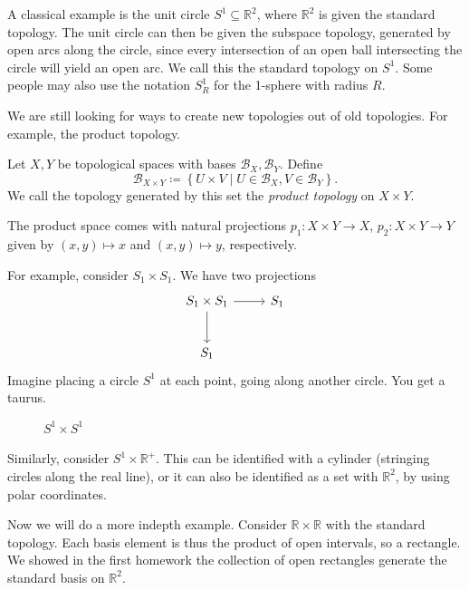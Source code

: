 A classical example is the unit circle $S^1\subseteq \mathbb{R} ^2$, where $\mathbb{R} ^2$ is given the standard topology. The unit circle can then be given the subspace topology, generated by open arcs along the circle, since every intersection of an open ball intersecting the circle will yield an open arc. We call this the standard topology on $S^1$. Some people may also use the notation $S_R^1$ for the 1-sphere with radius $R$.

We are still looking for ways to create new topologies out of old topologies. For example, the product topology.
\begin{definition}\label{dfn:2.8}
	Let $X,Y$ be topological spaces with bases $\mathcal{B}_X,\mathcal{B}_Y$. Define
	\[
		\mathcal{B}_{X\times Y} \coloneqq \left\{ U\times V\mid U\in \mathcal{B}_X, V\in \mathcal{B}_Y \right\} 
	.\]
	We call the topology generated by this set the \emph{product topology} on $X\times Y$.
\end{definition}
The product space comes with natural projections $p_1 : X\times Y \to X$, $p_2 : X\times Y \to Y$ given by $(x,y)\mapsto x$ and $(x,y)\mapsto y$, respectively.

For example, consider $S_1\times S_1$. We have two projections
\[\begin{tikzcd}[row sep = 2.5em, column sep = 2.5em]
	S_1\times S_1\arrow[d]\arrow[r]&S_1\\
	S_1
\end{tikzcd}\]
Imagine placing a circle $S^1$ at each point, going along another circle. You get a taurus.
\begin{figure}[ht]
    \centering
    \caption{$S^1\times S^1$}\label{fig:Taurus}
    \centering
\end{figure}

Similarly, consider $S^1\times \mathbb{R}^+ $. This can be identified with a cylinder (stringing circles along the real line), or it can also be identified as a set with $\mathbb{R} ^2$, by using polar coordinates.

Now we will do a more indepth example. Consider $\mathbb{R} \times \mathbb{R} $ with the standard topology. Each basis element is thus the product of open intervals, so a rectangle. We showed in the first homework the collection of open rectangles generate the standard basis on $\mathbb{R} ^2$.

